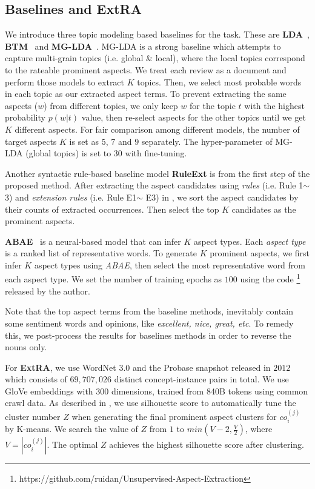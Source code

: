 \subsection{Baselines and ExtRA}
\label{sec:base}
We introduce three topic modeling based baselines for the task.
These are \textbf{LDA}~\cite{Blei2003LatentDA}, 
\textbf{BTM}~\cite{DBLP:journals/tkde/ChengYLG14} and  
\textbf{MG-LDA}~\cite{titov2008modeling}. MG-LDA is a strong
baseline which attempts to capture multi-grain topics (i.e. global \& local), where the local topics correspond to the rateable prominent aspects.
We treat each review as a document and perform those models
to extract $K$ topics.
Then, we select most probable words in 
each topic as our extracted aspect terms. 
To prevent extracting the same aspects ($w$) from different topics, 
we only keep $w$ for the topic $t$ with the highest 
probability $p(w|t)$ value, then re-select aspects for the other 
topics until we get $K$ different aspects. 
For fair comparison among different models, the number of 
target aspects $K$ is set as $5$, $7$ and $9$ separately. 
The hyper-parameter of 
MG-LDA (global topics) is set to 30 with fine-tuning.

Another syntactic rule-based baseline model 
\textbf{RuleExt} is from the first step of 
the proposed method. 
After extracting the aspect candidates using
\emph{rules} (i.e. Rule 1$\sim$ 3) and \emph{extension rules}
(i.e. Rule E1$\sim$ E3) in , 
we sort the aspect candidates by 
their counts of extracted occurrences. 
Then select the top $K$ 
candidates as the prominent aspects.

\textbf{ABAE}~\cite{DBLP:conf/acl/HeLND17}  is a neural-based model that can
infer $K$ aspect types. 
Each \emph{aspect type} is a ranked list of representative words.
To generate $K$ prominent aspects, 
we first infer $K$ aspect types using \emph{ABAE}, 
then select the most representative word from each
aspect type. We set the number of training
epochs as $100$ using the code \footnote{https://github.com/ruidan/Unsupervised-Aspect-Extraction} released by the author.

Note that the top aspect terms from the baseline methods, 
inevitably contain some sentiment words and opinions, like \textit{
excellent, nice, great, etc}. 
To remedy this, we post-process the results for baselines methods
in order to reverse the nouns only.

For \textbf{ExtRA},  
we use WordNet $3.0$ and the Probase snapshot
released in $2012$
which consists of $69,707,026$
distinct concept-instance pairs in total.
We use GloVe embeddings 
with 300 dimensions, trained from 840B tokens using common crawl data. 
As described in ,
we use silhouette score to automatically tune the 
cluster number $Z$ when generating the
final prominent aspect clusters for $co_i^{(j)}$ by
K-means.
We search the value of $Z$ from $1$ to $min(V-2, \frac{V}{2})$,
where $V=|co_i^{(j)}|$.
The optimal $Z$ achieves the 
highest silhouette score after clustering.

